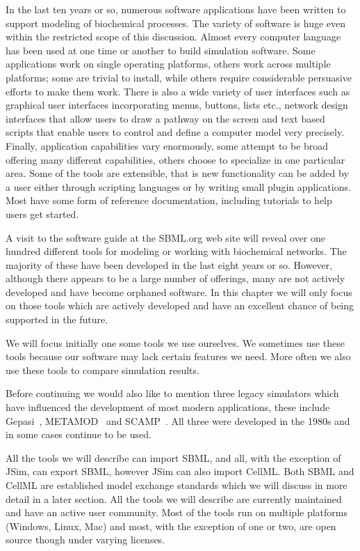\documentclass[12pt]{article}
\begin{document}
In the last ten years or so, numerous software applications have
been written to support modeling of biochemical processes. The
variety of software is huge even within the restricted scope of this
discussion. Almost every computer language has been used at one time
or another to build simulation software. Some applications work on
single operating platforms, others work across multiple platforms;
some are trivial to install, while others require considerable
persuasive efforts to make them work. There is also a wide variety
of user interfaces such as graphical user interfaces incorporating
menus, buttons, lists etc., network design interfaces that allow
users to draw a pathway on the screen and text based scripts that
enable users to control and define a computer model very precisely.
Finally, application capabilities vary enormously, some attempt to
be broad offering many different capabilities, others choose to
specialize in one particular area. Some of the tools are
extensible, that is new functionality can be added by a user either
through scripting languages or by writing small plugin applications.
Most have some form of reference documentation, including tutorials
to help users get started.

A visit to the software guide at the SBML.org web site will reveal
over one hundred different tools for modeling or working with biochemical networks.
The majority of these have been developed in the last eight years or
so. However, although there appears to be a large number of
offerings, many are not actively developed and have become orphaned
software. In this chapter we will only focus on those tools which
are actively developed and have an excellent chance of being
supported in the future.

We will focus initially one some tools we use ourselves. We
sometimes use these tools because our software may lack certain
features we need. More often we also use these tools to compare
simulation results.

Before continuing we would also like to mention
three legacy simulators which have influenced the development of
most modern applications, these include Gepasi~\citep{Gepasi:1993},
METAMOD~\citep{HM86} and SCAMP~\citep{SauroF91,SauroScamp:1993}. All
three were developed in the 1980s and in some cases continue to be
used.

All the tools we will describe can import SBML, and all, with the exception of JSim, can export
SBML, however JSim can also import CellML.
Both SBML and CellML are established model exchange standards which
we will discuss in more detail in a later section. All the tools we
will describe are currently maintained and have an active user
community. Most of the tools run on multiple platforms (Windows,
Linux, Mac) and most, with the exception of one or two, are open
source though under varying licenses.
\end{document}

